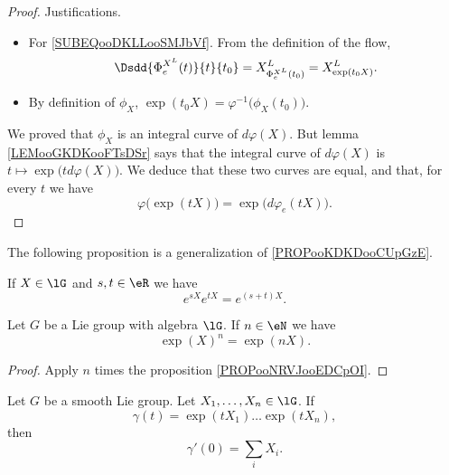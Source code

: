\begin{proof}
	Justifications.
	\begin{itemize}
		\item For \eqref{SUBEQooDKLLooSMJbVf}. From the definition of the flow,
		      \begin{equation}
			      \Dsdd{ \Phi_e^{X^L}(t) }{t}{t_0}=X^{L}_{\Phi^{X^L}_e(t_0)}=X^L_{\exp(t_0X)}.
		      \end{equation}
		\item
		      By definition of \( \phi_X\), \( \exp(t_0X)=\varphi^{-1}\big( \phi_X(t_0) \big)\).
	\end{itemize}
	We proved that \( \phi_X\) is an integral curve of \( d\varphi(X)\). But lemma \ref{LEMooGKDKooFTsDSr} says that the integral curve of \( d\varphi(X)\) is \( t\mapsto \exp\big( td\varphi(X) \big)\). We deduce that these two curves are equal, and that, for every \( t\) we have
	\begin{equation}
		\varphi\big( \exp(tX) \big)=\exp\big( d\varphi_e(tX) \big).
	\end{equation}
\end{proof}

The following proposition is a generalization of \ref{PROPooKDKDooCUpGzE}.
\begin{proposition}     \label{PROPooNRVJooEDCpOI}
	If \( X\in \lG\) and \( s,t\in \eR\) we have
	\begin{equation}
		e^{sX} e^{tX}= e^{(s+t)X}.
	\end{equation}
\end{proposition}

\begin{lemma}       \label{LEMooRPHVooAtZJnz}
	Let \( G\) be a Lie group with algebra \( \lG\). If \( n\in \eN\) we have
	\begin{equation}
		\exp(X)^n=\exp(nX).
	\end{equation}
\end{lemma}

\begin{proof}
	Apply \( n\) times the proposition \ref{PROPooNRVJooEDCpOI}.
\end{proof}

\begin{proposition}	\label{PROPooFJNEooKUhJUl}
	Let \( G\) be a smooth Lie group. Let \( X_1,\ldots,X_n\in \lG\). If
	\begin{equation}
		\gamma(t)=\exp(tX_1)\ldots \exp(tX_n),
	\end{equation}
	then
	\begin{equation}
		\gamma'(0)=\sum_iX_i.
	\end{equation}
\end{proposition}


